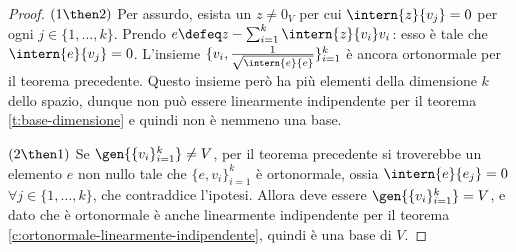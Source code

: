 \begin{proof}
	$(1\then 2)$ Per assurdo, esista un $  z\neq 0_V$ per cui $\intern{  z}{  v_j}=0$ per ogni $j\in\{1,\dots,k\}$.
	Prendo $  e\defeq  z-\sum_{i=1}^k\intern{  z}{  v_i}  v_i$: esso è tale che $\intern{  e}{  v_j}=0$.
	L'insieme $\{  v_i,\frac1{\sqrt{\intern{  e}{  e}}}\}_{i=1}^k$ è ancora ortonormale per il teorema precedente.
	Questo insieme però ha più elementi della dimensione $k$ dello spazio, dunque non può essere linearmente indipendente per il teorema \ref{t:base-dimensione} e quindi non è nemmeno una base.
	
	$(2\then 1)$ Se $\gen{\{  v_i\}_{i=1}^k}\neq V$, per il teorema precedente si troverebbe un elemento $  e$ non nullo tale che $\{  e,  v_i\}_{i=1}^k$ è ortonormale, ossia $\intern{  e}{  e_j}=0$ $\forall j\in\{1,\dots,k\}$, che contraddice l'ipotesi.
	Allora deve essere $\gen{\{  v_i\}_{i=1}^k} = V$, e dato che è ortonormale è anche linearmente indipendente per il teorema \ref{c:ortonormale-linearmente-indipendente}, quindi è una base di $V$.
\end{proof}

